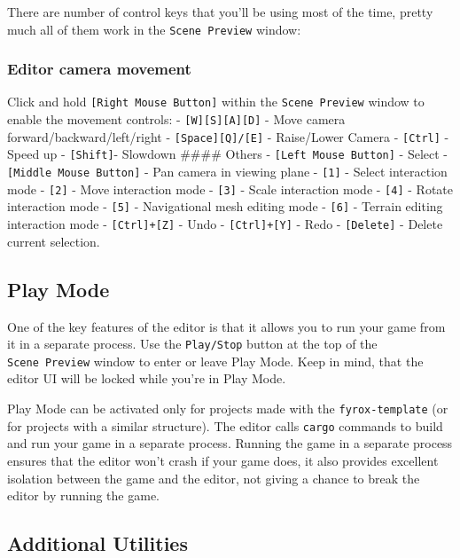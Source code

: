 \documentclass[
]{book}
\theoremstyle{definition}
\theoremstyle{definition}
\theoremstyle{definition}
\theoremstyle{definition}
\theoremstyle{remark}
\begin{document}
There are number of control keys that you'll be using most of the time, pretty much all of them work in the \texttt{Scene\ Preview} window:

\subsubsection{Editor camera movement}\label{editor-camera-movement}

Click and hold \texttt{{[}Right\ Mouse\ Button{]}} within the \texttt{Scene\ Preview} window to enable the movement controls:
- \texttt{{[}W{]}{[}S{]}{[}A{]}{[}D{]}} - Move camera forward/backward/left/right
- \texttt{{[}Space{]}{[}Q{]}/{[}E{]}} - Raise/Lower Camera
- \texttt{{[}Ctrl{]}} - Speed up
- \texttt{{[}Shift{]}}- Slowdown
\#\#\#\# Others
- \texttt{{[}Left\ Mouse\ Button{]}} - Select
- \texttt{{[}Middle\ Mouse\ Button{]}} - Pan camera in viewing plane
- \texttt{{[}1{]}} - Select interaction mode
- \texttt{{[}2{]}} - Move interaction mode
- \texttt{{[}3{]}} - Scale interaction mode
- \texttt{{[}4{]}} - Rotate interaction mode
- \texttt{{[}5{]}} - Navigational mesh editing mode
- \texttt{{[}6{]}} - Terrain editing interaction mode
- \texttt{{[}Ctrl{]}+{[}Z{]}} - Undo
- \texttt{{[}Ctrl{]}+{[}Y{]}} - Redo
- \texttt{{[}Delete{]}} - Delete current selection.

\subsection{Play Mode}\label{play-mode}

One of the key features of the editor is that it allows you to run your game from it in a separate process. Use the \texttt{Play/Stop} button at the top of the \texttt{Scene\ Preview} window to enter or leave Play Mode. Keep in mind, that the editor UI will be locked while you're in Play Mode.

Play Mode can be activated only for projects made with the \texttt{fyrox-template} (or for projects with a similar structure). The editor calls \texttt{cargo} commands to build and run your game in a separate process. Running the game in a separate process ensures that the editor won't crash if your game does, it also provides excellent isolation between the game and the editor, not giving a chance to break the editor by running the game.

\subsection{Additional Utilities}\label{additional-utilities}
\end{document}
